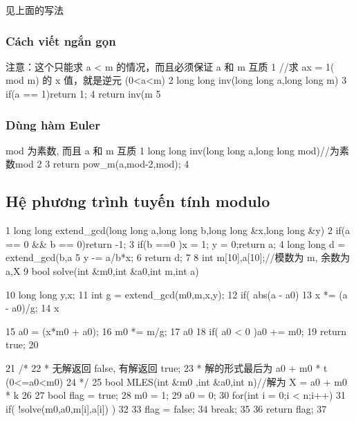 \documentclass[11pt]{article}
\begin{document}
\begin{Code}
     见上面的写法
\end{Code}

\subsubsection{Cách viết ngắn gọn}

\begin{Code}
     注意：这个只能求 a < m 的情况，而且必须保证 a 和 m 互质
1 //求 ax = 1( mod m) 的 x 值，就是逆元 (0<a<m)
2 long long inv(long long a,long long m){
3     if(a == 1)return 1;
4     return inv(m%
5 }
\end{Code}

\subsubsection{Dùng hàm Euler}

\begin{Code}
     mod 为素数, 而且 a 和 m 互质
1 long long inv(long long a,long long mod)//为素数mod
2 {
3     return pow_m(a,mod-2,mod);
4 }
\end{Code}

\subsection{Hệ phương trình tuyến tính modulo}

\begin{Code}
 1 long long extend_gcd(long long a,long long b,long long &x,long long
        &y){
 2     if(a == 0 && b == 0)return -1;
 3     if(b ==0 ){x = 1; y = 0;return a;}
 4     long long d = extend_gcd(b,a%
 5     y -= a/b*x;
 6     return d;
 7 }
 8 int m[10],a[10];//模数为 m, 余数为 a,X %
 9 bool solve(int &m0,int &a0,int m,int a){
10     long long y,x;
11     int g = extend_gcd(m0,m,x,y);
12     if( abs(a - a0)%
13     x *= (a - a0)/g;
14     x %


15         a0 = (x*m0 + a0);
16         m0 *= m/g;
17         a0 %
18         if( a0 < 0 )a0 += m0;
19         return true;
20   }
21   /*
22     * 无解返回 false, 有解返回 true;
23     * 解的形式最后为 a0 + m0 * t (0<=a0<m0)
24     */
25   bool MLES(int &m0 ,int &a0,int n)//解为    X = a0 + m0 * k
26   {
27        bool flag = true;
28        m0 = 1;
29        a0 = 0;
30        for(int i = 0;i < n;i++)
31            if( !solve(m0,a0,m[i],a[i]) )
32        {
33            flag = false;
34            break;
35        }
36        return flag;
37   }
\end{Code}
\end{document}
